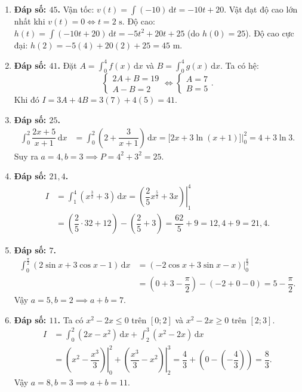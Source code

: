 \documentclass[12pt,a4paper]{article}
\begin{document}
\begin{enumerate}[start=21]
\item \textbf{Đáp số: $45$.}  
Vận tốc: $v(t) = \int (-10)\,\mathrm{d}t = -10t + 20$. Vật đạt độ cao lớn nhất khi $v(t) = 0 \iff t = 2\text{ s}$.  
Độ cao: $h(t) = \int (-10t + 20)\,\mathrm{d}t = -5t^2 + 20t + 25$ (do $h(0) = 25$).  
Độ cao cực đại: $h(2) = -5(4) + 20(2) + 25 = 45\text{ m}$.

\item \textbf{Đáp số: $41$.}  
Đặt $A = \int_0^4 f(x)\,\mathrm{d}x$ và $B = \int_0^4 g(x)\,\mathrm{d}x$. Ta có hệ:
\[
\begin{cases} 2A + B = 19 \\ A - B = 2 \end{cases} \iff \begin{cases} A = 7 \\ B = 5 \end{cases}.
\]
Khi đó $I = 3A + 4B = 3(7) + 4(5) = 41$.

\item \textbf{Đáp số: $25$.}  
\begin{align*}
\int_0^2 \dfrac{2x + 5}{x + 1}\,\mathrm{d}x &= \int_0^2 \left(2 + \dfrac{3}{x + 1}\right)\,\mathrm{d}x = \left.\bigl[2x + 3\ln(x + 1)\bigr]\right|_0^2 = 4 + 3\ln 3.
\end{align*}
Suy ra $a = 4, b = 3 \implies P = 4^2 + 3^2 = 25$.

\item \textbf{Đáp số: $21{,}4$.}  
\begin{align*}
I &= \int_1^4 \left(x^{\frac{3}{2}} + 3\right)\,\mathrm{d}x = \left.\left(\dfrac{2}{5}x^{\frac{5}{2}} + 3x\right)\right|_1^4 \\
&= \left(\dfrac{2}{5}\cdot 32 + 12\right) - \left(\dfrac{2}{5} + 3\right) = \dfrac{62}{5} + 9 = 12{,}4 + 9 = 21{,}4.
\end{align*}

\item \textbf{Đáp số: $7$.}  
\begin{align*}
\int_0^{\frac{\pi}{2}} (2\sin x + 3\cos x - 1)\,\mathrm{d}x &= \left.(-2\cos x + 3\sin x - x)\right|_0^{\frac{\pi}{2}} \\
&= \left(0 + 3 - \dfrac{\pi}{2}\right) - (-2 + 0 - 0) = 5 - \dfrac{\pi}{2}.
\end{align*}
Vậy $a = 5, b = 2 \implies a + b = 7$.

\item \textbf{Đáp số: $11$.}  
Ta có $x^2 - 2x \le 0$ trên $[0; 2]$ và $x^2 - 2x \ge 0$ trên $[2; 3]$.  
\begin{align*}
I &= \int_0^2 (2x - x^2)\,\mathrm{d}x + \int_2^3 (x^2 - 2x)\,\mathrm{d}x \\
&= \left.\left(x^2 - \dfrac{x^3}{3}\right)\right|_0^2 + \left.\left(\dfrac{x^3}{3} - x^2\right)\right|_2^3 = \dfrac{4}{3} + \left(0 - \left(-\dfrac{4}{3}\right)\right) = \dfrac{8}{3}.
\end{align*}
Vậy $a = 8, b = 3 \implies a + b = 11$.


\end{enumerate}
\end{document}
